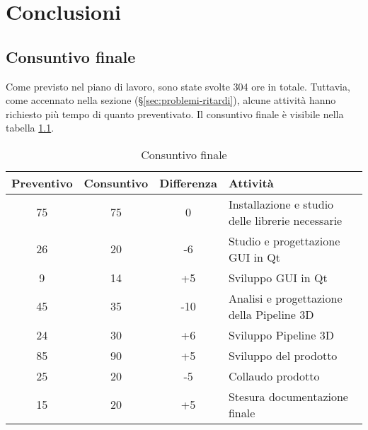 
\chapter{Conclusioni}
\label{cap:conclusioni}

\section{Consuntivo finale}
Come previsto nel piano di lavoro, sono state svolte 304 ore in totale. Tuttavia, come accennato nella sezione  (§\ref{sec:problemi-ritardi}), alcune attività hanno richiesto più tempo di quanto preventivato. Il consuntivo finale è visibile nella tabella \ref{table:consuntivo-finale}.

\begin{center}
    \begin{table}[h]
    \def\arraystretch{1.5}
    \begin{tabular}{| c | c | c | p{5cm} |}
        \hline
        \textbf{Preventivo} & \textbf{Consuntivo} & \textbf{Differenza} & \textbf{Attività} \\ \hline  
        75 & 75 & 0 & Installazione e studio delle librerie necessarie\\ \hline
        26 & 20 & -6 & Studio e progettazione GUI in Qt\\ \hline
        9 & 14 & +5 & Sviluppo GUI in Qt\\ \hline
        45 & 35 & -10 & Analisi e progettazione della Pipeline 3D\\ \hline
        24 & 30 & +6 & Sviluppo Pipeline 3D\\ \hline
        85 & 90 & +5 & Sviluppo del prodotto\\ \hline
        25 & 20 & -5 & Collaudo prodotto\\ \hline
        15 & 20 & +5 & Stesura documentazione finale\\ \hline
    \end{tabular}
    \caption{Consuntivo finale}
    \label{table:consuntivo-finale}
    \end{table}
\end{center}

